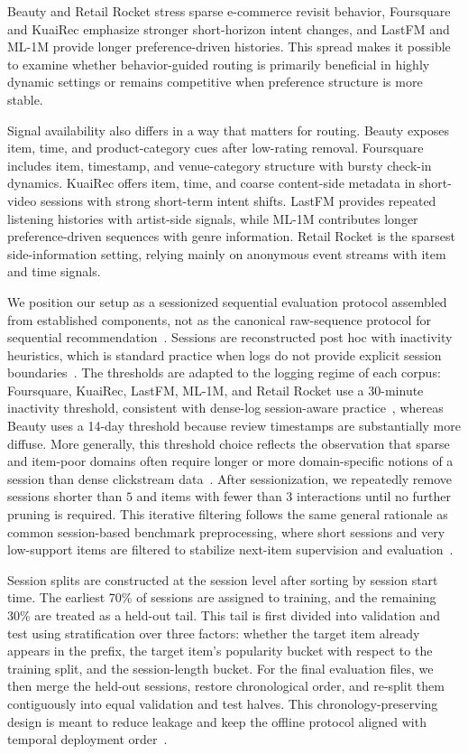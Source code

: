\documentclass[sigconf,review,anonymous]{acmart}
\begin{document}
Beauty and Retail Rocket stress sparse e-commerce revisit behavior, Foursquare and KuaiRec emphasize stronger short-horizon intent changes, and LastFM and ML-1M provide longer preference-driven histories. This spread makes it possible to examine whether behavior-guided routing is primarily beneficial in highly dynamic settings or remains competitive when preference structure is more stable.

Signal availability also differs in a way that matters for routing. Beauty exposes item, time, and product-category cues after low-rating removal. Foursquare includes item, timestamp, and venue-category structure with bursty check-in dynamics. KuaiRec offers item, time, and coarse content-side metadata in short-video sessions with strong short-term intent shifts. LastFM provides repeated listening histories with artist-side signals, while ML-1M contributes longer preference-driven sequences with genre information. Retail Rocket is the sparsest side-information setting, relying mainly on anonymous event streams with item and time signals.

We position our setup as a sessionized sequential evaluation protocol assembled from established components, not as the canonical raw-sequence protocol for sequential recommendation~\cite{jannach2022sessions,quadrana2017hrnn,latifi2021sessionaware}. Sessions are reconstructed post hoc with inactivity heuristics, which is standard practice when logs do not provide explicit session boundaries~\cite{jannach2022sessions}. The thresholds are adapted to the logging regime of each corpus: Foursquare, KuaiRec, LastFM, ML-1M, and Retail Rocket use a 30-minute inactivity threshold, consistent with dense-log session-aware practice~\cite{quadrana2017hrnn,lacic2020jobsessions}, whereas Beauty uses a 14-day threshold because review timestamps are substantially more diffuse. More generally, this threshold choice reflects the observation that sparse and item-poor domains often require longer or more domain-specific notions of a session than dense clickstream data~\cite{borgbruun2022insurance}. After sessionization, we repeatedly remove sessions shorter than $5$ and items with fewer than $3$ interactions until no further pruning is required. This iterative filtering follows the same general rationale as common session-based benchmark preprocessing, where short sessions and very low-support items are filtered to stabilize next-item supervision and evaluation~\cite{li2017narm,wu2019srgnn}.

Session splits are constructed at the session level after sorting by session start time. The earliest 70\% of sessions are assigned to training, and the remaining 30\% are treated as a held-out tail. This tail is first divided into validation and test using stratification over three factors: whether the target item already appears in the prefix, the target item's popularity bucket with respect to the training split, and the session-length bucket. For the final evaluation files, we then merge the held-out sessions, restore chronological order, and re-split them contiguously into equal validation and test halves. This chronology-preserving design is meant to reduce leakage and keep the offline protocol aligned with temporal deployment order~\cite{ji2023leakage,gusak2025timesplit}.
\end{document}
